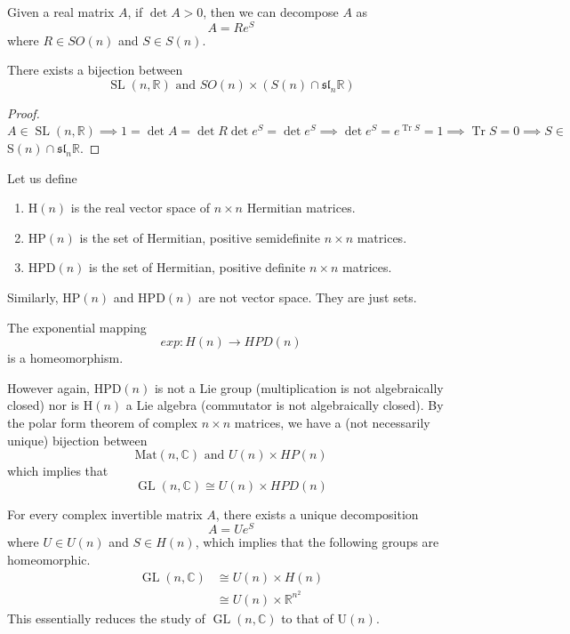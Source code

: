 \documentclass{article}
\DeclareMathOperator{\Tr}{Tr}
\DeclareMathOperator{\GL}{GL}
\DeclareMathOperator{\SL}{SL}
\begin{document}
    \begin{corollary}
    Given a real matrix $A$, if $\det{A} > 0$, then we can decompose $A$ as
    \[A = R e^S\]
    where $R \in SO(n)$ and $S \in S(n)$. 
    \end{corollary}

    \begin{corollary}
    There exists a bijection between
    \[\SL(n, \mathbb{R}) \text{ and } SO(n) \times (S(n) \cap \mathfrak{sl}_n \mathbb{R})\]
    \end{corollary}
    \begin{proof}
    $A \in \SL(n, \mathbb{R}) \implies 1 = \det{A} = \det{R} \det{e^S} = \det{e^S} \implies \det{e^S} = e^{\Tr{S}} = 1 \implies \Tr{S} = 0 \implies S \in$ S$(n) \cap \mathfrak{sl}_n \mathbb{R}$. 
    \end{proof}

    \begin{definition}
    Let us define
    \begin{enumerate}
        \item H$(n)$ is the real vector space of $n \times n$ Hermitian matrices. 
        \item HP$(n)$ is the set of Hermitian, positive semidefinite $n \times n$ matrices. 
        \item HPD$(n)$ is the set of Hermitian, positive definite $n \times n$ matrices. 
    \end{enumerate}
    Similarly, HP$(n)$ and HPD$(n)$ are not vector space. They are just sets. 
    \end{definition}

    \begin{lemma}
    The exponential mapping
    \[exp: H(n) \longrightarrow HPD(n)\]
    is a homeomorphism. 
    \end{lemma}

    However again, HPD$(n)$ is not a Lie group (multiplication is not algebraically closed) nor is H$(n)$ a Lie algebra (commutator is not algebraically closed). By the polar form theorem of complex $n \times n$ matrices, we have a (not necessarily unique) bijection between
    \[\text{Mat}(n, \mathbb{C}) \text{ and } U(n) \times HP(n)\]
    which implies that
    \[\GL(n, \mathbb{C}) \cong U(n) \times HPD (n)\]
    \begin{corollary}
    For every complex invertible matrix $A$, there exists a unique decomposition
    \[A = U e^S \]
    where $U \in U(n)$ and $S \in H(n)$, which implies that the following groups are homeomorphic. 
    \begin{align*}
        \GL(n, \mathbb{C}) & \cong U(n) \times H(n) \\
        & \cong U(n) \times \mathbb{R}^{n^2}
    \end{align*} 
    This essentially reduces the study of $\GL(n, \mathbb{C})$ to that of U$(n)$. 
    \end{corollary}
\end{document}
